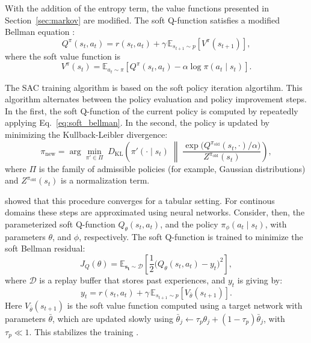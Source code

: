 \documentclass[preprint,10pt]{elsarticle}
\begin{document}
With the addition of the entropy term, the value functions presented in Section~\ref{sec:markov} are modified. The soft Q-function satisfies a modified Bellman equation \citep{haarnoja2018soft}:
\begin{equation}
    Q^\pi(s_t, a_t) = r(s_t, a_t) + \gamma \, \mathbb{E}_{s_{t+1} \sim p}\left[V^\pi(s_{t+1})\right],
    \label{eq:soft_bellman}
\end{equation}
where the soft value function is
\begin{equation}
    V^\pi(s_t) = \mathbb{E}_{a_t \sim \pi}\left[Q^\pi(s_t, a_t) - \alpha \log \pi(a_t \mid s_t)\right].
    \label{eq:soft_value}
\end{equation}

The SAC training algorithm is based on the soft policy iteration algortihm. This algorithm alternates between the policy evaluation and policy improvement steps. In the first, the soft Q-function of the current policy is computed by repeatedly applying Eq.~\eqref{eq:soft_bellman}. In the second, the policy is updated by minimizing the Kullback-Leibler divergence:
\begin{equation}
    \pi_{\text{new}} = \arg\min_{\pi' \in \Pi} \; D_{\mathrm{KL}}\left( \pi'(\cdot \mid s_t) \;\middle\|\; \frac{\exp\big(Q^{\pi_{\text{old}}}(s_t, \cdot)/\alpha\big)}{Z^{\pi_{\text{old}}}(s_t)} \right),
    \label{eq:policy_improvement}
\end{equation}
where $\Pi$ is the family of admissible policies (for example, Gaussian distributions) and $Z^{\pi_{\text{old}}}(s_t)$ is a normalization term.

\cite{haarnoja2018algorithms} showed that this procedure converges for a tabular setting. For continous domains these steps are approximated using neural networks. Consider, then, the parameterized soft Q-function $Q_\theta(s_t, a_t)$, and the policy $\pi_\phi(a_t \mid s_t)$, with parameters $\theta$, and $\phi$, respectively. The soft Q-function is trained to minimize the soft Bellman residual:
\begin{equation}
    J_Q(\theta) = \mathbb{E}_{\mathbf{s_t} \sim \mathcal{D}}\left[\frac{1}{2}\Big(Q_{\theta}(s_t, a_t) - y_t\Big)^2\right],
    \label{eq:soft_bellman_residual}
\end{equation} 
where $\mathcal{D}$ is a replay buffer that stores past experiences, and $y_t$ is giving by:
\begin{equation}
    y_t = r(s_t, a_t) + \gamma \, \mathbb{E}_{s_{t+1} \sim p}\left[V_{\bar{\theta}}(s_{t+1})\right].
    \label{eq:soft_bellman_target}
\end{equation}
Here $V_{\bar{\theta}}(s_{t+1})$ is the soft value function computed using a target network with parameters $\bar{\theta}$, which are updated slowly using $\bar{\theta}_j \leftarrow \tau_p \theta_j + (1 - \tau_p)\bar{\theta}_j$, with $\tau_p \ll 1$. This stabilizes the training \citep{mnih2015human}.
\end{document}
